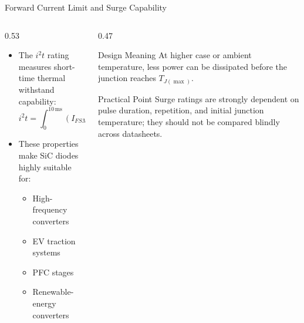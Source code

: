 \begin{frame}{Forward Current Limit and Surge Capability}
\begin{columns}
\begin{column}{0.53\textwidth}
\begin{itemize}
    \item The $i^2t$ rating measures short-time thermal withstand capability:
    \[
        i^2t=\int_0^{10\,\mathrm{ms}}
        \left(I_{FSM}\sin{\omega t}\right)^2dt
        \approx 0.005\,I_{FSM}^2
    \]
    \item These properties make SiC diodes highly suitable for:
    \begin{itemize}
        \item High-frequency converters
        \item EV traction systems
        \item PFC stages
        \item Renewable-energy converters
    \end{itemize}
\end{itemize}

\end{column}

\begin{column}{0.47\textwidth}
\begin{block}{Design Meaning}
\small
At higher case or ambient temperature, less power can be dissipated before the junction reaches $T_{J(\max)}$.
\end{block}

\begin{block}{Practical Point}
\small
Surge ratings are strongly dependent on pulse duration, repetition, and initial junction temperature; they should not be compared blindly across datasheets.
\end{block}

\end{column}
\end{columns}
\end{frame}




